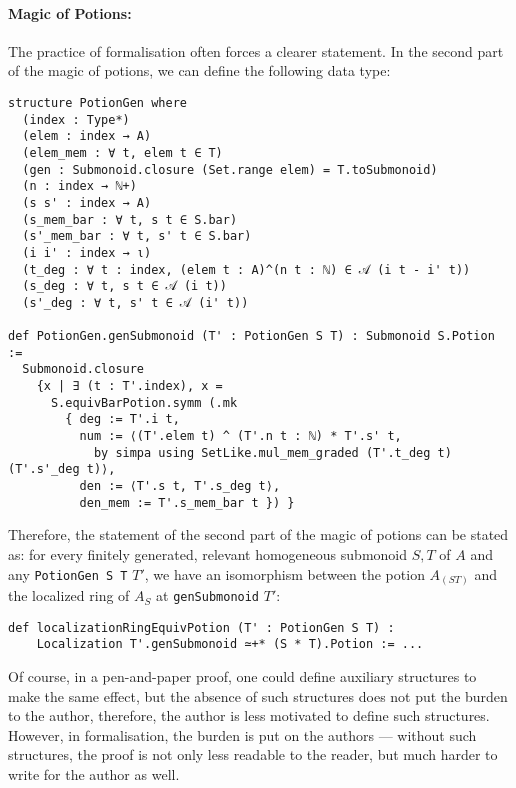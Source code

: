 \documentclass[graybox]{svmult}
\begin{document}
\paragraph{Magic of Potions:}%
The practice of formalisation often forces a clearer statement.
In the second part of the magic of potions, we can define the following data type:
\begin{lstlisting}
structure PotionGen where
  (index : Type*)
  (elem : index → A)
  (elem_mem : ∀ t, elem t ∈ T)
  (gen : Submonoid.closure (Set.range elem) = T.toSubmonoid)
  (n : index → ℕ+)
  (s s' : index → A)
  (s_mem_bar : ∀ t, s t ∈ S.bar)
  (s'_mem_bar : ∀ t, s' t ∈ S.bar)
  (i i' : index → ι)
  (t_deg : ∀ t : index, (elem t : A)^(n t : ℕ) ∈ 𝒜 (i t - i' t))
  (s_deg : ∀ t, s t ∈ 𝒜 (i t))
  (s'_deg : ∀ t, s' t ∈ 𝒜 (i' t))

def PotionGen.genSubmonoid (T' : PotionGen S T) : Submonoid S.Potion :=
  Submonoid.closure
    {x | ∃ (t : T'.index), x =
      S.equivBarPotion.symm (.mk
        { deg := T'.i t,
          num := ⟨(T'.elem t) ^ (T'.n t : ℕ) * T'.s' t,
            by simpa using SetLike.mul_mem_graded (T'.t_deg t) (T'.s'_deg t)⟩,
          den := ⟨T'.s t, T'.s_deg t⟩,
          den_mem := T'.s_mem_bar t }) }
\end{lstlisting}
Therefore, the statement of the second part of the magic of potions can be stated as:
for every finitely generated, relevant homogeneous submonoid $S, T$ of $A$ and any \lstinline|PotionGen S T| $T'$, we have an isomorphism between
the potion $A_{(ST)}$ and the localized ring of $A_S$ at \lstinline|genSubmonoid| $T'$:
\begin{lstlisting}
def localizationRingEquivPotion (T' : PotionGen S T) :
    Localization T'.genSubmonoid ≃+* (S * T).Potion := ...
\end{lstlisting}
Of course, in a pen-and-paper proof, one could define auxiliary structures to make the same effect, 
but the absence of such structures does not put the burden to the author, therefore, the author is 
less motivated to define such structures. However, in formalisation, 
the burden is put on the authors --- without such structures, the proof is not only less readable to the reader, but much harder to write for the author as well.
\end{document}
